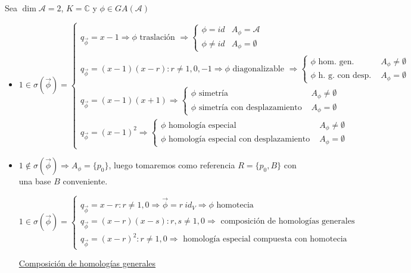 \documentclass[10pt,a4paper,openright]{book}
\begin{document}
Sea $\dim \mathcal{A} = 2$, $K = \mathbb{C}$ y $\phi \in GA(\mathcal{A})$
\begin{itemize}
\item $1 \in \sigma(\vec{\phi}) = \begin{cases} q_{\vec{\phi}} = x - 1 \Rightarrow \phi \mbox{ traslación } \Rightarrow \begin{cases} \phi = id & A_\phi = \mathcal{A} \\ \phi \neq id & A_\phi = \emptyset \end{cases} \\ q_{\vec{\phi}} = (x-1)(x-r) : r \neq 1,0,-1 \Rightarrow \phi \mbox{ diagonalizable } \Rightarrow \begin{cases} \phi \mbox{ hom. gen. } & A_\phi \neq \emptyset \\ \phi \mbox{ h. g. con desp. } & A_\phi = \emptyset \end{cases} \\ q_{\vec{\phi}} = (x-1)(x+1) \Rightarrow \begin{cases} \phi \mbox{ simetría } & A_\phi \neq \emptyset \\  \phi \mbox{ simetría con desplazamiento } & A_\phi = \emptyset\end{cases} \\ q_{\vec{\phi}} = (x-1)^2  \Rightarrow \begin{cases} \phi \mbox{ homología especial } & A_\phi \neq \emptyset \\ \phi \mbox{ homología especial con desplazamiento } & A_\phi = \emptyset   \end{cases} \end{cases}$

\item $1 \notin \sigma(\vec{\phi}) \Rightarrow A_\phi = \{ p_0\}$, luego tomaremos como referencia $R=\{p_0, B\}$ con una base $B$ conveniente.

$1 \in \sigma(\vec{\phi}) = \begin{cases} q_{\vec{\phi}} = x - r : r \neq 1,0 \Rightarrow \vec{\phi} = r \ id_V \Rightarrow \phi \mbox{ homotecia } \\  q_{\vec{\phi}} = (x - r)(x-s) : r,s \neq 1,0 \Rightarrow \mbox{ composición de homologías generales } \\ q_{\vec{\phi}} = (x - r)^2 : r \neq 1,0 \Rightarrow \mbox{ homología especial compuesta con homotecia } \end{cases}$

\underline{Composición de homologías generales}


\end{itemize}
\end{document}
